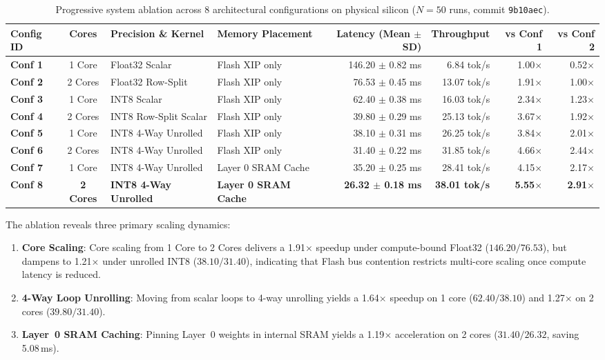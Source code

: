 \documentclass[10pt,a4paper]{article}
\begin{document}
\begin{table}[t]
\centering
\small
\caption{Progressive system ablation across 8 architectural configurations on physical silicon ($N=50$ runs, commit \texttt{9b10aec}).}
\label{tab:ablation}
\begin{tabularx}{\textwidth}{l c l l r r r r}
\toprule
\textbf{Config ID} & \textbf{Cores} & \textbf{Precision \& Kernel} & \textbf{Memory Placement} & \textbf{Latency (Mean $\pm$ SD)} & \textbf{Throughput} & \textbf{vs Conf 1} & \textbf{vs Conf 2} \\
\midrule
\textbf{Conf 1} & 1 Core & Float32 Scalar & Flash XIP only & 146.20 $\pm$ 0.82 ms & 6.84 tok/s & 1.00$\times$ & 0.52$\times$ \\
\textbf{Conf 2} & 2 Cores & Float32 Row-Split & Flash XIP only & 76.53 $\pm$ 0.45 ms & 13.07 tok/s & 1.91$\times$ & 1.00$\times$ \\
\textbf{Conf 3} & 1 Core & INT8 Scalar & Flash XIP only & 62.40 $\pm$ 0.38 ms & 16.03 tok/s & 2.34$\times$ & 1.23$\times$ \\
\textbf{Conf 4} & 2 Cores & INT8 Row-Split Scalar & Flash XIP only & 39.80 $\pm$ 0.29 ms & 25.13 tok/s & 3.67$\times$ & 1.92$\times$ \\
\textbf{Conf 5} & 1 Core & INT8 4-Way Unrolled & Flash XIP only & 38.10 $\pm$ 0.31 ms & 26.25 tok/s & 3.84$\times$ & 2.01$\times$ \\
\textbf{Conf 6} & 2 Cores & INT8 4-Way Unrolled & Flash XIP only & 31.40 $\pm$ 0.22 ms & 31.85 tok/s & 4.66$\times$ & 2.44$\times$ \\
\textbf{Conf 7} & 1 Core & INT8 4-Way Unrolled & Layer 0 SRAM Cache & 35.20 $\pm$ 0.25 ms & 28.41 tok/s & 4.15$\times$ & 2.17$\times$ \\
\textbf{Conf 8} & \textbf{2 Cores} & \textbf{INT8 4-Way Unrolled} & \textbf{Layer 0 SRAM Cache} & \textbf{26.32 $\pm$ 0.18 ms} & \textbf{38.01 tok/s} & \textbf{5.55$\times$} & \textbf{2.91$\times$} \\
\bottomrule
\end{tabularx}
\end{table}

The ablation reveals three primary scaling dynamics:
\begin{enumerate}
    \item \textbf{Core Scaling}: Core scaling from 1 Core to 2 Cores delivers a 1.91$\times$ speedup under compute-bound Float32 ($146.20 / 76.53$), but dampens to 1.21$\times$ under unrolled INT8 ($38.10 / 31.40$), indicating that Flash bus contention restricts multi-core scaling once compute latency is reduced.
    \item \textbf{4-Way Loop Unrolling}: Moving from scalar loops to 4-way unrolling yields a 1.64$\times$ speedup on 1 core ($62.40 / 38.10$) and 1.27$\times$ on 2 cores ($39.80 / 31.40$).
    \item \textbf{Layer~0 SRAM Caching}: Pinning Layer~0 weights in internal SRAM yields a 1.19$\times$ acceleration on 2 cores ($31.40 / 26.32$, saving 5.08\,ms).
\end{enumerate}
\end{document}
